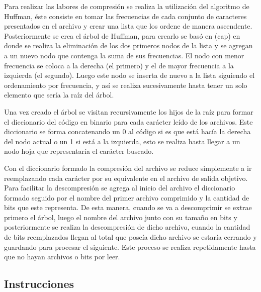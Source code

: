 \documentclass{report}
\begin{document}
Para realizar las labores de compresión se realiza la utilización del algoritmo de Huffman, éste consiste en tomar las frecuencias de cada conjunto de caracteres presentados en el archivo y crear una lista que los ordene de manera ascendente. Posteriormente se crea el árbol de Huffman, para crearlo se basó en (cap) en donde se realiza la eliminación de los dos primeros nodos de la lista y se agregan a un nuevo nodo que contenga la suma de sus frecuencias. El nodo con menor frecuencia se coloca a la derecha (el primero) y el de mayor frecuencia a la izquierda (el segundo). Luego este nodo se inserta de nuevo a la lista siguiendo el ordenamiento por frecuencia, y así se realiza sucesivamente hasta tener un solo elemento que sería la raíz del árbol.

Una vez creado el árbol se visitan recursivamente los hijos de la raíz para formar el diccionario del código en binario para cada carácter leído de los archivos. Este diccionario se forma concatenando un 0 al código si es que está hacía la derecha del nodo actual o un 1 si está a la izquierda, esto se realiza hasta llegar a un nodo hoja que representaría el carácter buscado.

Con el diccionario formado la compresión del archivo se reduce simplemente a ir reemplazando cada carácter por su equivalente en el archivo de salida objetivo. Para facilitar la descompresión se agrega al inicio del archivo el diccionario formado seguido por el nombre del primer archivo comprimido y la cantidad de bits que este representa. De esta manera, cuando se va a descomprimir se extrae primero el árbol, luego el nombre del archivo junto con su tamaño en bits y posteriormente se realiza la descompresión de dicho archivo, cuando la cantidad de bits reemplazados llegan al total que poseía dicho archivo se estaría cerrando y guardando para procesar el siguiente. Este proceso se realiza repetidamente hasta que no hayan archivos o bits por leer.

\subsection{Instrucciones}
\end{document}
